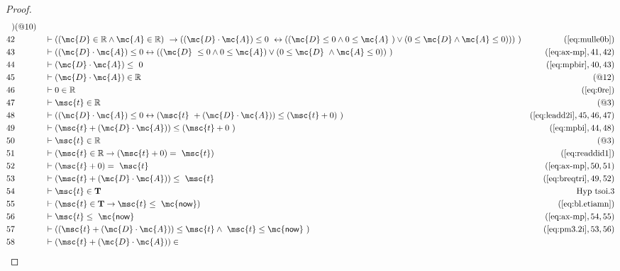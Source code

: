 \begin{proof}
\begin{align}
     ~)&(@10)\notag
  \\ 42 &&  & \vdash ( ( \mc{D} \in \mathbb{R} \wedge \mc{A} \in \mathbb{R} )
     ~\rightarrow ( ( \mc{D} \cdot \mc{A} ) \le 0
     ~\leftrightarrow ( ( \mc{D} \le 0 \wedge 0 \le \mc{A}
     ~) \vee ( 0 \le \mc{D} \wedge \mc{A} \le 0 ) ) )
     ~)&(\mbox{\ref{eq:mulle0b}})\notag
  \\ 43 &&  & \vdash ( ( \mc{D} \cdot \mc{A} ) \le 0 \leftrightarrow ( ( \mc{D}
     ~\le 0 \wedge 0 \le \mc{A} ) \vee ( 0 \le \mc{D}
     ~\wedge \mc{A} \le 0 ) )
     ~)&(\mbox{\ref{eq:ax-mp}},41,42)\notag
  \\ 44 &&  & \vdash ( \mc{D} \cdot \mc{A} ) \le
     ~0&(\mbox{\ref{eq:mpbir}},40,43)\notag
  \\ 45 &&  & \vdash ( \mc{D} \cdot \mc{A} ) \in \mathbb{R}&(@12)\notag
  \\ 46 &&  & \vdash 0 \in \mathbb{R}&(\mbox{\ref{eq:0re}})\notag
  \\ 47 &&  & \vdash \msc{t} \in \mathbb{R}&(@3)\notag
  \\ 48 &&  & \vdash ( ( \mc{D} \cdot \mc{A} ) \le 0 \leftrightarrow ( \msc{t}
     ~+ ( \mc{D} \cdot \mc{A} ) ) \le ( \msc{t} + 0 )
     ~)&(\mbox{\ref{eq:leadd2i}},45,46,47)\notag
  \\ 49 &&  & \vdash ( \msc{t} + ( \mc{D} \cdot \mc{A} ) ) \le ( \msc{t} + 0
     ~)&(\mbox{\ref{eq:mpbi}},44,48)\notag
  \\ 50 &&  & \vdash \msc{t} \in \mathbb{R}&(@3)\notag
  \\ 51 &&  & \vdash ( \msc{t} \in \mathbb{R} \rightarrow ( \msc{t} + 0 ) =
     ~\msc{t} )&(\mbox{\ref{eq:readdid1}})\notag
  \\ 52 &&  & \vdash ( \msc{t} + 0 ) =
     ~\msc{t}&(\mbox{\ref{eq:ax-mp}},50,51)\notag
  \\ 53 &&  & \vdash ( \msc{t} + ( \mc{D} \cdot \mc{A} ) ) \le
     ~\msc{t}&(\mbox{\ref{eq:breqtri}},49,52)\notag
  \\ 54 &&  & \vdash \msc{t} \in \mathbf{T}&\text{Hyp~tsoi.3}\notag%
  \\ 55 &&  & \vdash ( \msc{t} \in \mathbf{T} \rightarrow \msc{t} \le
     ~\mathsf{\mc{now}} )&(\mbox{\ref{eq:bl.etiamn}})\notag
  \\ 56 &&  & \vdash \msc{t} \le
     ~\mathsf{\mc{now}}&(\mbox{\ref{eq:ax-mp}},54,55)\notag
  \\ 57 &&  & \vdash ( ( \msc{t} + ( \mc{D} \cdot \mc{A} ) ) \le \msc{t} \wedge
     ~\msc{t} \le \mathsf{\mc{now}}
     ~)&(\mbox{\ref{eq:pm3.2i}},53,56)\notag
  \\ 58 &&  & \vdash ( \msc{t} + ( \mc{D} \cdot \mc{A} ) ) \in

\end{align}
\end{proof}

